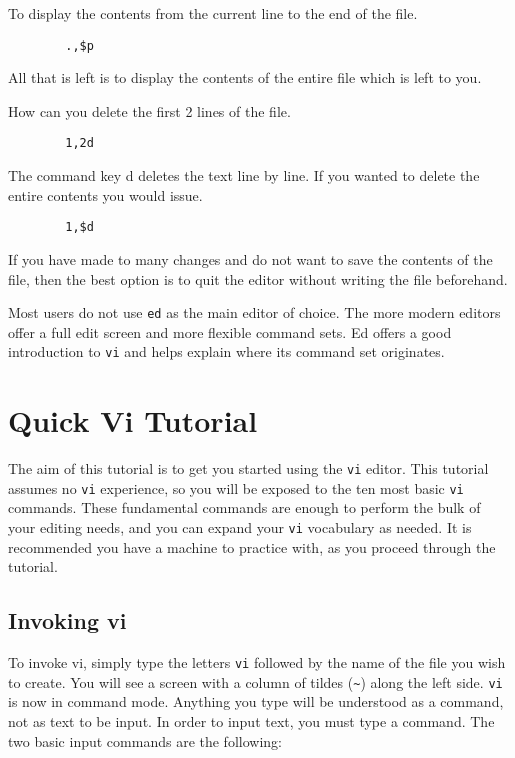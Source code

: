         To display the contents from the current line to the end of the
file.
\begin{verbatim}
        .,$p
\end{verbatim}

        All that is left is to display the contents of the entire file which
is left to you.

        How can you delete the first 2 lines of the file.
\begin{verbatim}
        1,2d
\end{verbatim}

The command key {\key d} deletes the text line by line. If you wanted
to delete the entire contents you would issue.
\begin{verbatim}
        1,$d
\end{verbatim}

If you have made to many changes and do not want to save the contents
of the file, then the best option is to quit the editor without
writing the file beforehand.

Most users do not use {\tt ed} as the main editor of choice. The more modern
editors offer a full edit screen and more flexible command sets.  Ed
offers a good introduction to {\tt vi} and helps explain where its
command set originates.


\section{Quick Vi Tutorial}
The aim of this tutorial is to get you started using the {\tt vi} editor. This
tutorial assumes no {\tt vi} experience, so you will be exposed to the ten most basic
{\tt vi} commands.
These fundamental commands are enough to perform the bulk of your editing needs, and
you can expand your {\tt vi} vocabulary as needed. It is recommended you
have a machine to practice with, as you proceed through the tutorial.

\subsection{Invoking vi}
To invoke vi, simply type the letters {\tt vi} followed by the name
of the file you wish to create.  You will see a screen with
a column of tildes (\verb"~") along the left side. {\tt vi} is now in 
command mode.  Anything you type will be understood as a command, not
as text to be input.  In order to input text, you must type a command.
The two basic input commands are the following:

